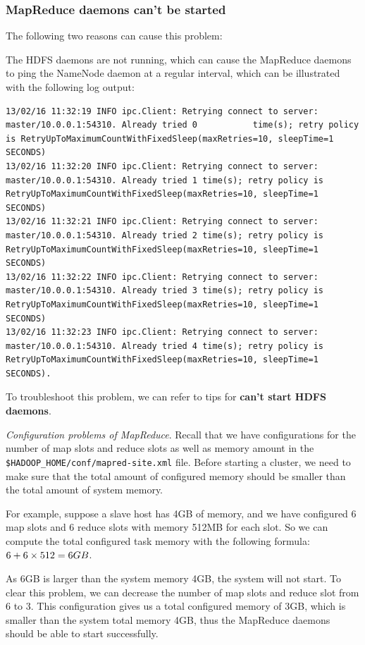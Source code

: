 \subsubsection*{MapReduce daemons can't be started}
The following two reasons can cause this problem:

The HDFS daemons are not running, which can cause the MapReduce daemons to ping the NameNode daemon at a regular interval, which can be illustrated with the following log output:
\lstset{style=bashstyle}
\begin{lstlisting}
13/02/16 11:32:19 INFO ipc.Client: Retrying connect to server: master/10.0.0.1:54310. Already tried 0           time(s); retry policy is RetryUpToMaximumCountWithFixedSleep(maxRetries=10, sleepTime=1 SECONDS)
13/02/16 11:32:20 INFO ipc.Client: Retrying connect to server: master/10.0.0.1:54310. Already tried 1 time(s); retry policy is RetryUpToMaximumCountWithFixedSleep(maxRetries=10, sleepTime=1 SECONDS)
13/02/16 11:32:21 INFO ipc.Client: Retrying connect to server: master/10.0.0.1:54310. Already tried 2 time(s); retry policy is RetryUpToMaximumCountWithFixedSleep(maxRetries=10, sleepTime=1 SECONDS)
13/02/16 11:32:22 INFO ipc.Client: Retrying connect to server: master/10.0.0.1:54310. Already tried 3 time(s); retry policy is RetryUpToMaximumCountWithFixedSleep(maxRetries=10, sleepTime=1 SECONDS)
13/02/16 11:32:23 INFO ipc.Client: Retrying connect to server: master/10.0.0.1:54310. Already tried 4 time(s); retry policy is RetryUpToMaximumCountWithFixedSleep(maxRetries=10, sleepTime=1 SECONDS).
\end{lstlisting}

To troubleshoot this problem, we can refer to tips for \textbf{can't start HDFS daemons}.

\emph{Configuration problems of MapReduce}. Recall that we have configurations for the number of map slots and reduce slots as well as memory amount in the \verb|$HADOOP_HOME/conf/mapred-site.xml| file. Before starting a cluster, we need to make sure that the total amount of configured memory should be smaller than the total amount of system memory.

For example, suppose a slave host has 4GB of memory, and we have configured 6 map slots and 6 reduce slots with memory 512MB for each slot. So we can compute the total configured task memory with the following formula:  $6 \time 512 + 6 \times 512 = 6GB$.

As 6GB is larger than the system memory 4GB, the system will not start. To clear this problem, we can decrease the number of map slots and reduce slot from 6 to 3. This configuration gives us a total configured memory of 3GB, which is smaller than the system total memory 4GB, thus the MapReduce daemons should be able to start successfully.


